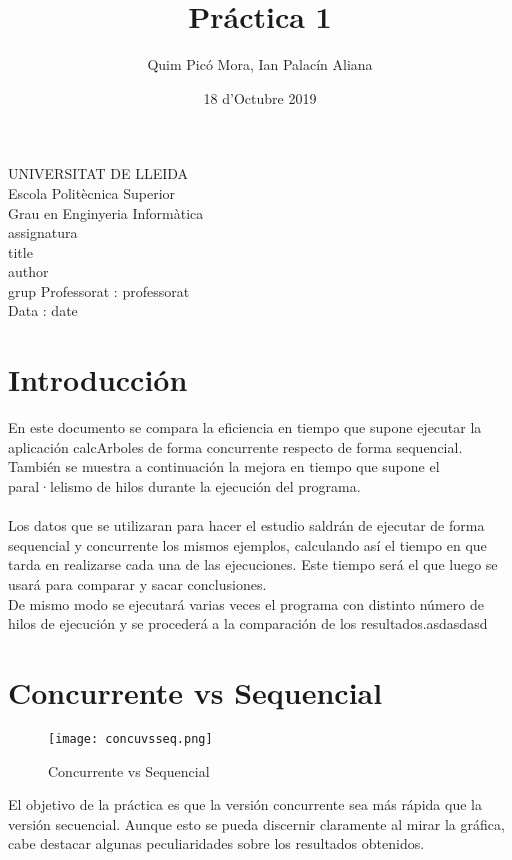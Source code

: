 \documentclass{article}
\title{Práctica 1}
\author{Quim Picó Mora, Ian Palacín Aliana}
\date{18 d'Octubre 2019}
\renewcommand{\maketitle}{ %
	\begin{titlepage}
		\raggedright{UNIVERSITAT DE LLEIDA \\
			Escola Politècnica Superior \\
			Grau en Enginyeria Informàtica\\
			\1assignatura\\}
		\vspace{5cm}
		\centering\huge{\5title \\}
		\vspace{3cm}
		\large{\6author} \\
		\normalsize{\3grup}
		\vfill
		Professorat : \4professorat \\
		Data : \7date
\end{titlepage}}
\begin{document}
	\maketitle
	\thispagestyle{empty}
	
	\newpage
	\tableofcontents
	\newpage
	




\section{Introducción}

En este documento se compara la eficiencia en tiempo que supone ejecutar la aplicación calcArboles de forma concurrente respecto de forma sequencial. También se muestra a continuación la mejora en tiempo que supone el paral·lelismo de hilos durante la ejecución del programa.
\\\\
Los datos que se utilizaran para hacer el estudio saldrán de ejecutar de forma sequencial y concurrente los mismos ejemplos, calculando así el tiempo en que tarda en realizarse cada una de las ejecuciones. Este tiempo será el que luego se usará para comparar y sacar conclusiones.\\
De mismo modo se ejecutará varias veces el programa con distinto número de hilos de ejecución y se procederá a la comparación de los resultados.asdasdasd


\section{Concurrente vs Sequencial}

\begin{figure}[hbt!]
  \texttt{[image: concuvsseq.png]}
  \caption{Concurrente vs Sequencial}
  \label{fig:convsseq}
\end{figure}
\newpage
El objetivo de la práctica es que la versión concurrente sea más rápida 
que la versión secuencial. Aunque esto se pueda discernir claramente al 
mirar la gráfica, cabe destacar algunas peculiaridades sobre los resultados
obtenidos.\\
\end{document}
